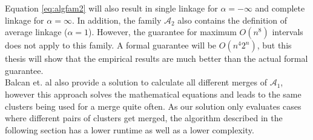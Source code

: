 Equation \ref{eq:algfam2} will also result in single linkage for $\alpha = - \infty$ and complete linkage for $\alpha = \infty$. In addition, the family $\mathcal{A}_2$ also contains the definition of average linkage ($\alpha = 1$). However, the guarantee for maximum $O(n^8)$ intervals does not apply to this family. A formal guarantee will be $O(n^4 2^n)$, but this thesis will show that the empirical results are much better than the actual formal guarantee.\\

Balcan et. al also provide a solution to calculate all different merges of $\mathcal{A}_1$, however this approach solves the mathematical equations and leads to the same clusters being used for a merge quite often. As our solution only evaluates cases where different pairs of clusters get merged, the algorithm described in the following section has a lower runtime as well as a lower complexity.